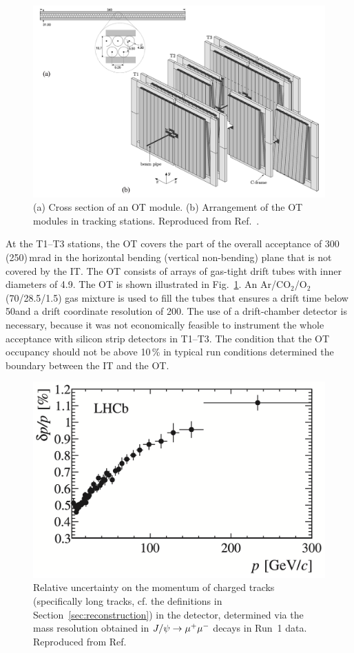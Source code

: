 \begin{figure}[tb]
    \centering
    \includegraphics[width=\columnwidth]{figures/detector/OT_stations.png}
    \caption{(a) Cross section of an OT module. (b) Arrangement of the OT modules in tracking stations. Reproduced from Ref.~\cite{OT-Performance}.}
    \label{fig:OT_station}
\end{figure}

At the T1--T3 stations, the OT covers the part of the overall acceptance of 300 (250)\,mrad in the horizontal bending (vertical non-bending) plane that is not covered by the IT. The OT consists of arrays of gas-tight drift tubes with inner diameters of 4.9\mm. The OT is shown illustrated in Fig.~\ref{fig:OT_station}. An Ar/CO$_2$/O$_2$ (70/28.5/1.5) gas mixture is used to fill the tubes that ensures a drift time below 50\ns and a drift coordinate resolution of 200\mum. The use of a drift-chamber detector is necessary, because it was not economically feasible to instrument the whole \lhcb acceptance with silicon strip detectors in T1--T3. The condition that the OT occupancy should not be above 10\,\% in typical run conditions determined the boundary between the IT and the OT. 

\begin{figure}[tb]
    \centering
    \includegraphics[width=0.55\columnwidth]{figures/detector/momentum_resolution.png}
    \caption{Relative uncertainty on the momentum of charged tracks (specifically long tracks, cf. the definitions in Section~\ref{sec:reconstruction}) in the \lhcb detector, determined via the mass resolution obtained in $J/\psi\rightarrow{\ensuremath{\mu^+}}\mu^-$ decays in Run~1 data. Reproduced from Ref.~\cite{LHCb-Performance}}
    \label{fig:momentum_resolution}
\end{figure}

